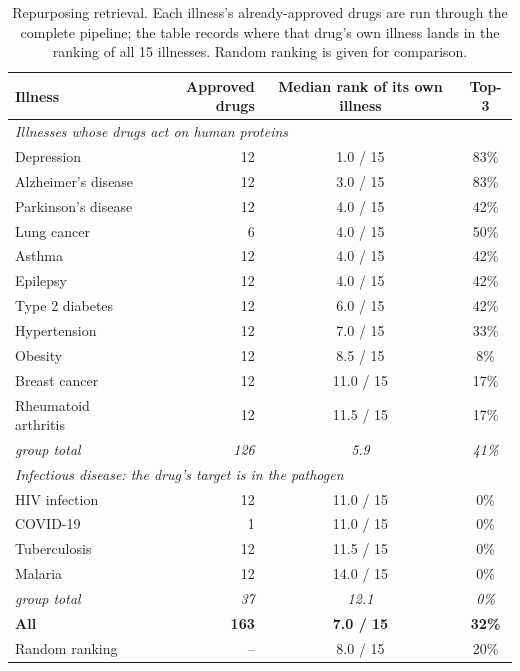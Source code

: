 \begin{table}[H]
\centering\small
\begin{tabular}{lrcc}
\toprule
Illness & Approved drugs & Median rank of its own illness & Top-3\\
\midrule
\multicolumn{4}{l}{\emph{Illnesses whose drugs act on human proteins}} \\
\quad Depression & 12 & 1.0 / 15 & 83\% \\
\quad Alzheimer's disease & 12 & 3.0 / 15 & 83\% \\
\quad Parkinson's disease & 12 & 4.0 / 15 & 42\% \\
\quad Lung cancer & 6 & 4.0 / 15 & 50\% \\
\quad Asthma & 12 & 4.0 / 15 & 42\% \\
\quad Epilepsy & 12 & 4.0 / 15 & 42\% \\
\quad Type 2 diabetes & 12 & 6.0 / 15 & 42\% \\
\quad Hypertension & 12 & 7.0 / 15 & 33\% \\
\quad Obesity & 12 & 8.5 / 15 & 8\% \\
\quad Breast cancer & 12 & 11.0 / 15 & 17\% \\
\quad Rheumatoid arthritis & 12 & 11.5 / 15 & 17\% \\
\quad \textit{group total} & \textit{126} & \textit{5.9} & \textit{41\%} \\
\midrule
\multicolumn{4}{l}{\emph{Infectious disease: the drug's target is in the pathogen}} \\
\quad HIV infection & 12 & 11.0 / 15 & 0\% \\
\quad COVID-19 & 1 & 11.0 / 15 & 0\% \\
\quad Tuberculosis & 12 & 11.5 / 15 & 0\% \\
\quad Malaria & 12 & 14.0 / 15 & 0\% \\
\quad \textit{group total} & \textit{37} & \textit{12.1} & \textit{0\%} \\
\midrule
\textbf{All} & \textbf{163} & \textbf{7.0 / 15} & \textbf{32\%} \\
Random ranking & -- & 8.0 / 15 & 20\% \\
\bottomrule
\end{tabular}
\caption{Repurposing retrieval. Each illness's already-approved drugs are run through the complete pipeline; the table records where that drug's own illness lands in the ranking of all 15 illnesses. Random ranking is given for comparison.}\label{tab:targets-validation}
\end{table}
